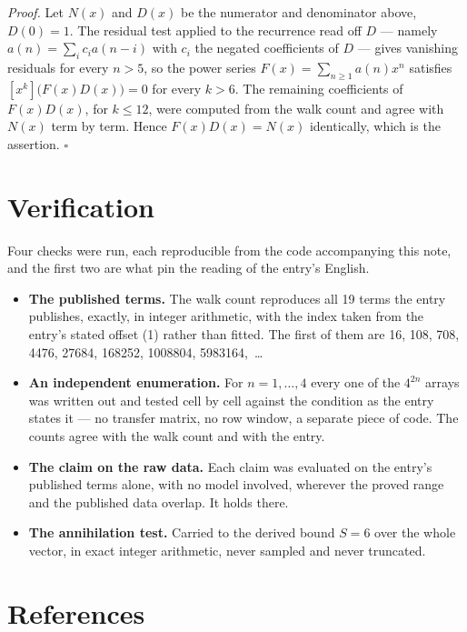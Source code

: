 \documentclass[11pt]{article}
\theoremstyle{definition}
\begin{document}
{\itshape Proof.} Let $N(x)$ and $D(x)$ be the numerator and denominator above, $D(0)=1$. The residual test applied to the recurrence read off $D$ --- namely $a(n) = \sum_i c_i a(n-i)$ with $c_i$ the negated coefficients of $D$ --- gives vanishing residuals for every $n > 5$, so the power series $F(x)=\sum_{n\ge 1}a(n)x^n$ satisfies $[x^k]\bigl(F(x)D(x)\bigr) = 0$ for every $k > 6$. The remaining coefficients of $F(x)D(x)$, for $k \le 12$, were computed from the walk count and agree with $N(x)$ term by term. Hence $F(x)D(x) = N(x)$ identically, which is the assertion. $\square$

\section{Verification}

Four checks were run, each reproducible from the code accompanying this note, and the first two are what pin the reading of the entry's English.

\begin{itemize}

\item {\bfseries The published terms.} The walk count reproduces all 19 terms the entry publishes, exactly, in integer arithmetic, with the index taken from the entry's stated offset (1) rather than fitted. The first of them are 16, 108, 708, 4476, 27684, 168252, 1008804, 5983164,~\dots

\item {\bfseries An independent enumeration.} For $n = 1,\dots,4$ every one of the $4^{2n}$ arrays was written out and tested cell by cell against the condition as the entry states it --- no transfer matrix, no row window, a separate piece of code. The counts agree with the walk count and with the entry.

\item {\bfseries The claim on the raw data.} Each claim was evaluated on the entry's published terms alone, with no model involved, wherever the proved range and the published data overlap. It holds there.

\item {\bfseries The annihilation test.} Carried to the derived bound $S = 6$ over the whole vector, in exact integer arithmetic, never sampled and never truncated.

\end{itemize}

\section{References}
\end{document}
